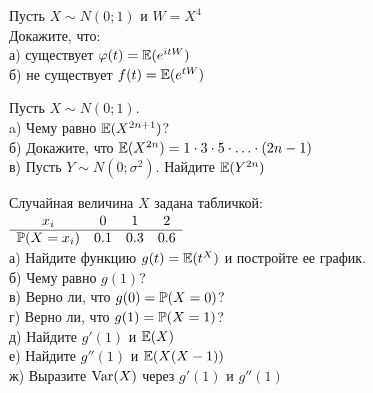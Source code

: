 \begin{problem}
Пусть $X\sim N(0;1)$ и $W=X^{4}$ \\
Докажите, что: \\
а) существует $\varphi(t)=\E(e^{itW})$ \\
б) не существует $f(t)=\E(e^{tW})$

\begin{sol}

\end{sol}
\end{problem}

\begin{problem}
Пусть $X\sim N(0;1)$. \\
a) Чему равно $\E(X^{2n+1})$? \\
б) Докажите, что $\E(X^{2n})=1\cdot 3\cdot 5\cdot\ldots\cdot(2n-1)$ \\
в) Пусть $Y\sim N(0;\sigma^{2})$. Найдите $\E(Y^{2n})$

\begin{sol}

\end{sol}
\end{problem}

\begin{problem}
Случайная величина $X$ задана табличкой: \\
$\begin{array}{cccc}
  x_{i} & 0 & 1 & 2 \\
  \hline
  \P(X=x_{i}) & 0.1 & 0.3 & 0.6 \\
\end{array}$ \\
а) Найдите функцию $g(t)=\E(t^{X})$ и постройте ее график. \\
б) Чему равно $g(1)$? \\
в) Верно ли, что $g(0)=\P(X=0)$? \\
г) Верно ли, что $g(1)=\P(X=1)$? \\
д) Найдите $g'(1)$ и $\E(X)$ \\
е) Найдите $g''(1)$ и $\E(X(X-1))$ \\
ж) Выразите $\Var(X)$ через $g'(1)$ и $g''(1)$

\begin{sol}

\end{sol}
\end{problem}

